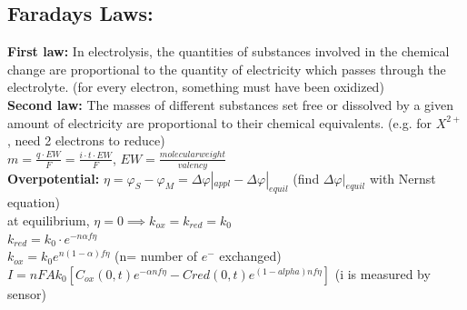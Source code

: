 \documentclass[9pt]{article}
\begin{document}
\begin{multicols}{2}
\subsection{Faradays Laws: }
\textbf{First law: }In electrolysis, the quantities of substances involved in the chemical
change are proportional to the quantity of electricity which passes
through the electrolyte. (for every electron, something must have been oxidized)\\
\textbf{Second law: }The masses of different substances set free or dissolved by a given
amount of electricity are proportional to their chemical equivalents. (e.g.  for $X^{2+}$, need 2 electrons to reduce)\\
$m=\frac{q\cdot EW }{F}=\frac{i\cdot t\cdot EW}{F}$, $EW=\frac{molecular weight}{valency}$\\
\textbf{Overpotential: }$\eta = \varphi _S - \varphi _M= \Delta \varphi |_{appl} -\Delta \varphi |_{equil} $ (find  $\Delta \varphi |_{equil}$ with Nernst equation)\\
at equilibrium, $\eta =0 \implies k_{ox}=k_{red}= k_0$\\
$k_{red}=k_0 \cdot e^{-n \alpha f \eta}$\\
$k_{ox}= k_0 e^{n(1-\alpha)f\eta}$		(n= number of $e^-$ exchanged)\\
$I=nFAk_0[C_{ox}(0,t)e^{-\alpha n f \eta }-C{red}(0,t)e^{(1-alpha)nf\eta}]$ (i is measured by sensor)

\end{multicols}
\end{document}
